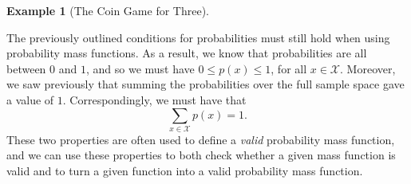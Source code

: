 \documentclass[
  letterpaper,
  DIV=11,
  numbers=noendperiod]{scrreprt}
\theoremstyle{definition}
\theoremstyle{definition}
\theoremstyle{definition}
\newtheorem{example}{Example}[chapter]
\theoremstyle{remark}
\begin{document}
\begin{example}[The Coin Game for
Three]
\begin{tcolorbox}[enhanced jigsaw, colback=white, breakable, rightrule=.15mm, leftrule=.75mm, toprule=.15mm, left=2mm, arc=.35mm, opacityback=0, bottomrule=.15mm]
\end{tcolorbox}



\end{example}

The previously outlined conditions for probabilities must still hold
when using probability mass functions. As a result, we know that
probabilities are all between \(0\) and \(1\), and so we must have
\(0 \leq p(x) \leq 1\), for all \(x\in\mathcal{X}\). Moreover, we saw
previously that summing the probabilities over the full sample space
gave a value of \(1\). Correspondingly, we must have that
\[\sum_{x\in\mathcal{X}} p(x) = 1.\] These two properties are often used
to define a \emph{valid} probability mass function, and we can use these
properties to both check whether a given mass function is valid and to
turn a given function into a valid probability mass function.
\end{document}

